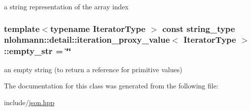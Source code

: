 a string representation of the array index 

\subsubsection[{\texorpdfstring{empty\+\_\+str}{empty_str}}]{\setlength{\rightskip}{0pt plus 5cm}template$<$typename Iterator\+Type $>$ const {\bf string\+\_\+type} {\bf nlohmann\+::detail\+::iteration\+\_\+proxy\+\_\+value}$<$ Iterator\+Type $>$\+::empty\+\_\+str = \char`\"{}\char`\"{}\hspace{0.3cm}{\ttfamily [private]}}\hypertarget{classnlohmann_1_1detail_1_1iteration__proxy__value_a298dae04e3c0a64719752c16754d1d71}{}\label{classnlohmann_1_1detail_1_1iteration__proxy__value_a298dae04e3c0a64719752c16754d1d71}


an empty string (to return a reference for primitive values) 



The documentation for this class was generated from the following file\+:\begin{DoxyCompactItemize}
\item 
include/\hyperlink{json_8hpp}{json.\+hpp}\end{DoxyCompactItemize}
